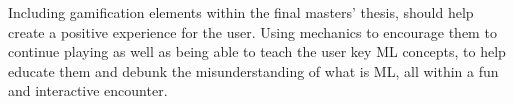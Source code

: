 	Including gamification elements within the final masters' thesis, should help create a positive experience for the user. Using mechanics to encourage them to continue playing as well as being able to teach the user key \ac{ML} concepts, to help educate them and debunk the misunderstanding of what is \ac{ML}, all within a fun and interactive encounter. 

%	
%	
%	
%	
%	
%		
	


